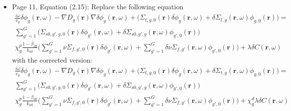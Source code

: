 \documentclass[12pt]{article}
\begin{document}
\begin{itemize}
    \item Page 11, Equation (2.15): Replace the  following equation
\begin{equation*}
        \begin{aligned}
                \frac{i \omega}{v_g} \delta \phi_g (\textbf{r}, \omega) - \nabla D_g(\textbf{r}) \nabla \delta \phi_g(\textbf{r}, \omega) + \biggl(\Sigma_{t,g,0}(\textbf{r}) \delta \phi_g(\textbf{r}, \omega) + \delta \Sigma_{t,g}(\textbf{r}, \omega) \phi_{g,0}(\textbf{r}) \biggr) = \\
                \sum_{g' = 1}^{G} \biggl(\Sigma_{s0,g',g,0}(\textbf{r}) \delta \phi_{g'}(\textbf{r}, \omega) + \delta \Sigma_{s0,g',g}(\textbf{r}, \omega) \phi_{g',0}(\textbf{r}) \biggr)\\
                \chi^p_g \frac{1-\beta_{\text{eff}}}{k_{\text{eff}}} \biggl(\sum_{g' = 1}^{G} \nu \Sigma_{f,g',0}(\textbf{r}) \delta \phi_{g'}(\textbf{r}, \omega) + \sum_{g' = 1}^{G} \delta \nu \Sigma_{f,g'}(\textbf{r}, \omega) \phi_{g',0}(\textbf{r}) \biggr) + \lambda \delta C(\textbf{r}, \omega)
        \end{aligned}
\end{equation*}
    with the corrected version:
\begin{equation*}
        \begin{aligned}
                \frac{i \omega}{v_g} \delta \phi_g (\textbf{r}, \omega) - \nabla D_g(\textbf{r}) \nabla \delta \phi_g(\textbf{r}, \omega) + \biggl(\Sigma_{t,g,0}(\textbf{r}) \delta \phi_g(\textbf{r}, \omega) + \delta \Sigma_{t,g}(\textbf{r}, \omega) \phi_{g,0}(\textbf{r}) \biggr) = \\
                \sum_{g' = 1}^{G} \biggl(\Sigma_{s0,g',g,0}(\textbf{r}) \delta \phi_{g'}(\textbf{r}, \omega) + \delta \Sigma_{s0,g',g}(\textbf{r}, \omega) \phi_{g',0}(\textbf{r}) \biggr)\\
                \chi^p_g \frac{1-\beta_{\text{eff}}}{k_{\text{eff}}} \biggl(\sum_{g' = 1}^{G} \nu \Sigma_{f,g',0}(\textbf{r}) \delta \phi_{g'}(\textbf{r}, \omega) + \sum_{g' = 1}^{G} \delta \nu \Sigma_{f,g'}(\textbf{r}, \omega) \phi_{g',0}(\textbf{r}) \biggr) + \chi^d_g \lambda \delta C(\textbf{r}, \omega)
        \end{aligned}
\end{equation*}


\end{itemize}
\end{document}
